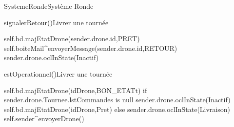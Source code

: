 \begin{OM}{SystemeRonde}{Système Ronde}
    \begin{OMOperation}{signalerRetour()}{Livrer une tournée}{}
        \begin{OMMessages}
        \end{OMMessages}
        \OMNoPre
        \begin{OMPost}
            self.bd.majEtatDrone(sender.drone.id,PRET)
            self.boiteMail^envoyerMessage(sender.drone.id,RETOUR)
            sender.drone.oclInState(Inactif)
        \end{OMPost}
    \end{OMOperation}

    \begin{OMOperation}{estOperationnel()}{Livrer une tournée}{}
        \begin{OMMessages}
        \end{OMMessages}
        \OMNoPre
        \begin{OMPost}
            self.bd.majEtatDrone(idDrone,BON_ETATt)
            if sender.drone.Tournee.lstCommandes is null
            sender.drone.oclInState(Inactif)
            self.bd.majEtatDrone(idDrone,Pret)
            else
            sender.drone.oclInState(Livraison)
            self.sender^envoyerDrone()
        \end{OMPost}
    \end{OMOperation}
\end{OM}
